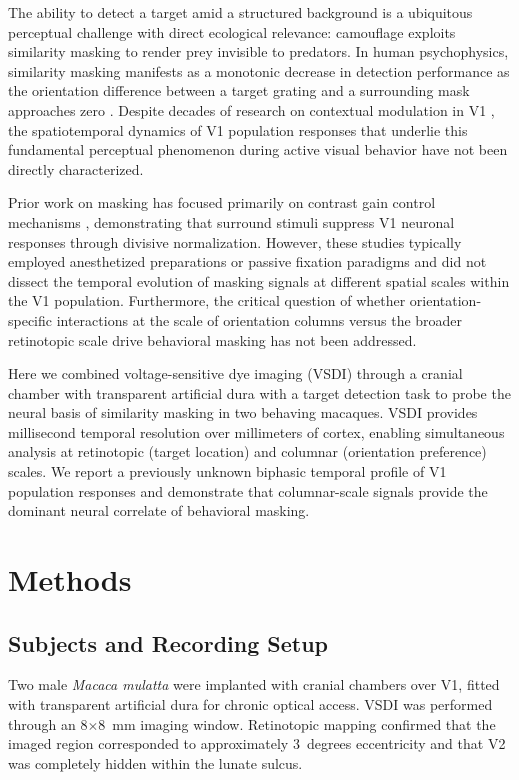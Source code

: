 \documentclass[11pt]{article}
\begin{document}
The ability to detect a target amid a structured background is a ubiquitous perceptual challenge with direct ecological relevance: camouflage exploits similarity masking to render prey invisible to predators. In human psychophysics, similarity masking manifests as a monotonic decrease in detection performance as the orientation difference between a target grating and a surrounding mask approaches zero \citep{foley1994,sebastian2017}. Despite decades of research on contextual modulation in V1 \citep{hubel1962,blakemore1970,cavanaugh2002,angelucci2017}, the spatiotemporal dynamics of V1 population responses that underlie this fundamental perceptual phenomenon during active visual behavior have not been directly characterized.

Prior work on masking has focused primarily on contrast gain control mechanisms \citep{heeger1992,carandini2012}, demonstrating that surround stimuli suppress V1 neuronal responses through divisive normalization. However, these studies typically employed anesthetized preparations or passive fixation paradigms and did not dissect the temporal evolution of masking signals at different spatial scales within the V1 population. Furthermore, the critical question of whether orientation-specific interactions at the scale of orientation columns versus the broader retinotopic scale drive behavioral masking has not been addressed.

Here we combined voltage-sensitive dye imaging (VSDI) through a cranial chamber with transparent artificial dura \citep{grinvald1999} with a target detection task to probe the neural basis of similarity masking in two behaving macaques. VSDI provides millisecond temporal resolution over millimeters of cortex, enabling simultaneous analysis at retinotopic (target location) and columnar (orientation preference) scales. We report a previously unknown biphasic temporal profile of V1 population responses and demonstrate that columnar-scale signals provide the dominant neural correlate of behavioral masking.

\section{Methods}

\subsection{Subjects and Recording Setup}

Two male \textit{Macaca mulatta} were implanted with cranial chambers over V1, fitted with transparent artificial dura for chronic optical access. VSDI was performed through an 8$\times$8~mm imaging window. Retinotopic mapping confirmed that the imaged region corresponded to approximately 3~degrees eccentricity and that V2 was completely hidden within the lunate sulcus.
\end{document}
